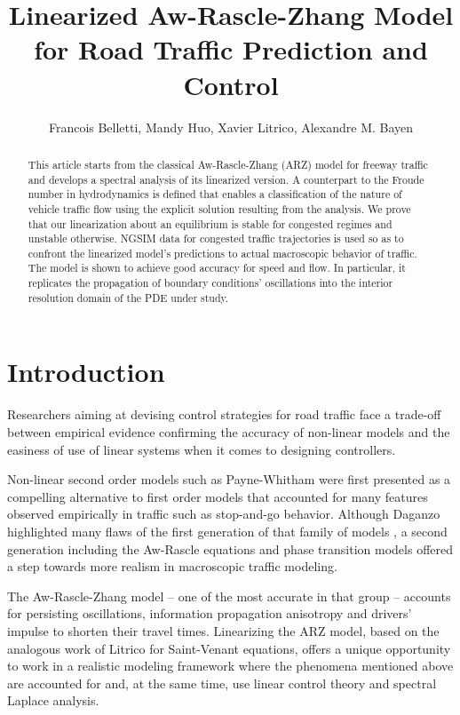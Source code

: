\documentclass[a4paper, 10pt, conference]{ieeeconf}      %
\title{\LARGE \bf
Linearized Aw-Rascle-Zhang Model for Road Traffic Prediction and Control
}
\author{Francois Belletti, Mandy Huo, Xavier Litrico, Alexandre M. Bayen}
\begin{document}
\maketitle
\thispagestyle{empty}
\pagestyle{empty}

\begin{abstract}
This article starts from the classical Aw-Rascle-Zhang (ARZ) model for freeway traffic and develops a spectral analysis of its linearized version. A counterpart to the Froude number in hydrodynamics is defined that enables a classification of the nature of vehicle traffic flow using the explicit solution resulting from the analysis. We prove that our linearization about an equilibrium is stable for congested regimes and unstable otherwise. NGSIM data for congested traffic trajectories is used so as to confront the linearized model's predictions to actual macroscopic behavior of traffic. The model is shown to achieve good accuracy for speed and flow. In particular, it replicates the propagation of boundary conditions' oscillations into the interior resolution domain of the PDE under study.
\end{abstract}


\section{Introduction}

Researchers aiming at devising control strategies for road traffic face a trade-off between empirical evidence confirming the accuracy of non-linear models \cite{zielke2008empirical, Jamitons2008} and the easiness of use of linear systems when it comes to designing controllers.

Non-linear second order models such as Payne-Whitham \cite{payne1971models, whitham1974linear} were first presented as a compelling alternative to first order models \cite{LW, Richards} that accounted for many features observed empirically in traffic such as stop-and-go behavior. Although Daganzo highlighted many flaws of the first generation of that family of models \cite{Dag_requiem}, a second generation including the Aw-Rascle equations \cite{AR} and phase transition models \cite{colombo2003hyperbolic} offered a step towards more realism in macroscopic traffic modeling.

The Aw-Rascle-Zhang model -- one of the most accurate in that group -- accounts for persisting oscillations, information propagation anisotropy and drivers' impulse to shorten their travel times. Linearizing the ARZ model, based on the analogous work of Litrico \cite{litrico2009modeling} for Saint-Venant equations, offers a unique opportunity to work in a realistic modeling framework where the phenomena mentioned above are accounted for and, at the same time, use linear control theory and spectral Laplace analysis.
\end{document}
